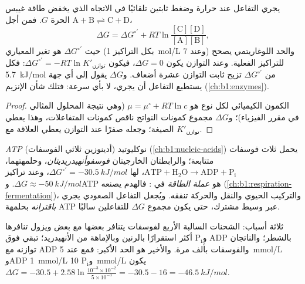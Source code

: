 \begin{proposition}\label{prop:b1:water-small-molecules:gibbs}
يجري التفاعل عند حرارة وضغط ثابتين تلقائيًا في الاتجاه الذي يخفض
طاقة غيبس الحرة $G$. فمن أجل
$\mathrm{A} + \mathrm{B} \rightleftharpoons \mathrm{C} + \mathrm{D}$،
\[
\Delta G = \Delta G^{\circ\prime} + RT\ln\frac{[\mathrm{C}][\mathrm{D}]}{[\mathrm{A}][\mathrm{B}]},
\]
حيث $\Delta G^{\circ\prime}$ هو تغير  المعياري (بكل
التراكيز \qty{1}{mol/L} وعند  7) والحد اللوغاريتمي يصحح للتراكيز
الفعلية. وعند التوازن يكون $\Delta G = 0$، فيكون
$\Delta G^{\circ\prime} = -RT\ln K'_{\text{توازن}}$: فكل
\qty{5.7}{kJ/mol} من $\Delta G^{\circ\prime}$ تزيح ثابت التوازن عشرة
أضعاف. و$\Delta G$ يقول إلى أي جهة يستطيع التفاعل أن يجري، لا بأي
سرعة: فتلك شأن الإنزيم (\cref{ch:b1:enzymes}).
\end{proposition}
\begin{proof}
الكمون الكيميائي لكل نوع هو $\mu = \mu^\circ + RT\ln c$ (وهي نتيجة
المحلول المثالي في مقرر الفيزياء)؛ و$\Delta G$ مجموع كمونات النواتج
ناقص كمونات المتفاعلات، وهذا يعطي الصيغة؛ وجعله صفرًا عند التوازن
يعطي العلاقة مع $K'_{\text{توازن}}$.
\end{proof}

\begin{definition}\label{def:b1:water-small-molecules:atp}
\emph{ATP} (أدينوزين ثلاثي الفوسفات) نوكليوتيد
(\cref{ch:b1:nucleic-acids}) يحمل ثلاث فوسفات متتابعة؛ والرابطتان
الخارجيتان \emph{فوسفوأنهيدريديتان}،
وحلمهتهما، $\mathrm{ATP} + \mathrm{H_2O} \to \mathrm{ADP} +
\mathrm{P_i}$، لها $\Delta G^{\circ\prime} = \qty{-30.5}{kJ/mol}$،
وعند تراكيز  $\Delta G \approx \qty{-50}{kJ/mol}$. وATP هو
\emph{عملة الطاقة} في : فالهدم يصنعه
(\cref{ch:b1:respiration-fermentation})، والتركيب الحيوي والنقل
والحركة تنفقه. ويُجعل التفاعل الصعودي يجري \emph{باقترانه}
بحلمهة ATP عبر وسيط مشترك، حتى يكون مجموع $\Delta G$ للتفاعلين سالبًا.
\end{definition}

\begin{example}\label{ex:b1:water-small-molecules:whyatp}
ثلاثة أسباب: الشحنات السالبة الأربع لفوسفات  يتنافر بعضها مع بعض
ويزول تنافرها بالشطر؛ والناتجان $\mathrm{ADP}$ و$\mathrm{P_i}$ أكثر
استقرارًا بالرنين وبالإماهة من الأنهيدريد؛  تبقي  فوق
توازنه مع ADP والفوسفات بألف مرة. والأخير هو الحد الأكبر: فمع  عند
\qty{5}{mmol/L} وADP \qty{1}{mmol/L} و$\mathrm{P_i}$
\qty{10}{mmol/L} يكون
$\Delta G = -30.5 + 2.58\ln\frac{10^{-3}\times 10^{-2}}{5\times 10^{-3}}
= -30.5 - 16 = \qty{-46.5}{kJ/mol}$.
\end{example}

